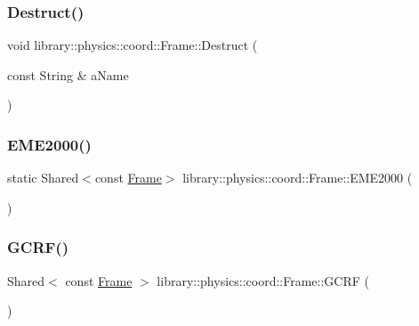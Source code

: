 \subsubsection{\texorpdfstring{Destruct()}{Destruct()}}
{\footnotesize\ttfamily void library\+::physics\+::coord\+::\+Frame\+::\+Destruct (\begin{DoxyParamCaption}\item[{const String \&}]{a\+Name }\end{DoxyParamCaption})\hspace{0.3cm}{\ttfamily [static]}}

\mbox{\label{classlibrary_1_1physics_1_1coord_1_1_frame_a16840fb31ca3fdaff3465a714b486683}} 
\subsubsection{\texorpdfstring{E\+M\+E2000()}{EME2000()}}
{\footnotesize\ttfamily static Shared$<$const \hyperlink{classlibrary_1_1physics_1_1coord_1_1_frame}{Frame}$>$ library\+::physics\+::coord\+::\+Frame\+::\+E\+M\+E2000 (\begin{DoxyParamCaption}{ }\end{DoxyParamCaption})\hspace{0.3cm}{\ttfamily [static]}}

\mbox{\label{classlibrary_1_1physics_1_1coord_1_1_frame_af69afe3a03044d0c8245fd814dc2e3ce}} 
\subsubsection{\texorpdfstring{G\+C\+R\+F()}{GCRF()}}
{\footnotesize\ttfamily Shared$<$ const \hyperlink{classlibrary_1_1physics_1_1coord_1_1_frame}{Frame} $>$ library\+::physics\+::coord\+::\+Frame\+::\+G\+C\+RF (\begin{DoxyParamCaption}{ }\end{DoxyParamCaption})\hspace{0.3cm}{\ttfamily [static]}}

